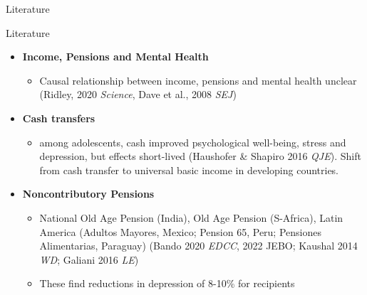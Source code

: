 \documentclass[handout] %
{beamer}
\begin{document}

\begin{frame}
\centering\huge{Literature}
\end{frame}

\begin{frame}{Literature %
}
\begin{itemize}
\item \textbf{Income, Pensions and Mental Health}
    \begin{itemize}
        \item Causal relationship between income, pensions and mental health unclear (Ridley, 2020 \textit{Science}, Dave et al., 2008 \textit{SEJ})
    \end{itemize} \pause
\item \textbf{Cash transfers}
    \begin{itemize}
        \item among adolescents, cash improved psychological well-being, stress and depression, but effects short-lived (Haushofer \& Shapiro 2016 \textit{QJE}). Shift from cash transfer to universal basic income in developing countries.
    \end{itemize} \pause
\item \textbf{Noncontributory Pensions}
    \begin{itemize}
        \item National Old Age Pension (India), Old Age Pension (S-Africa), Latin America (Adultos Mayores, Mexico; Pension 65, Peru; Pensiones Alimentarias, Paraguay) (Bando 2020 \textit{EDCC}, 2022 JEBO; Kaushal 2014 \textit{WD}; Galiani 2016 \textit{LE})
        \item These find reductions in depression of 8-10\% for recipients
    \end{itemize}
\end{itemize}
\end{frame}


\end{document}
